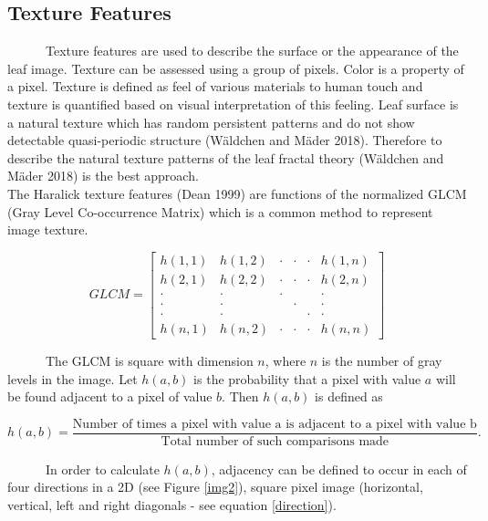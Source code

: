 \documentclass{article}
\begin{document}
\hypertarget{texture-features}{%
\subsection{Texture Features}\label{texture-features}}

~~~~~~Texture features are used to describe the surface or the
appearance of the leaf image. Texture can be assessed using a group of
pixels. Color is a property of a pixel. Texture is defined as feel of
various materials to human touch and texture is quantified based on
visual interpretation of this feeling. Leaf surface is a natural texture
which has random persistent patterns and do not show detectable
quasi-periodic structure (Wäldchen and Mäder 2018). Therefore to
describe the natural texture patterns of the leaf fractal theory
(Wäldchen and Mäder 2018) is the best approach.\\
\hspace*{0.333em}\hspace*{0.333em}\hspace*{0.333em}\hspace*{0.333em}\hspace*{0.333em}\hspace*{0.333em}The
Haralick texture features (Dean 1999) are functions of the normalized
GLCM (Gray Level Co-occurrence Matrix) which is a common method to
represent image texture.

\[GLCM = \begin{bmatrix}
h(1,1) & h(1,2)  & \cdot &\cdot &\cdot & h(1,n) \\ 
h(2,1) & h(2,2)  & \cdot &\cdot &\cdot & h(2,n) \\ 
\cdot  & \cdot & \cdot  & & &\cdot\\ 
\cdot  & \cdot &  & \cdot& &\cdot\\ 
\cdot  & \cdot &  & & \cdot &\cdot\\ 
h(n,1) & h(n,2) & \cdot &\cdot &\cdot & h(n,n)
\end{bmatrix}\]

~~~~~~The GLCM is square with dimension \(n\), where \(n\) is the number
of gray levels in the image. Let \(h(a,b)\) is the probability that a
pixel with value \(a\) will be found adjacent to a pixel of value \(b\).
Then \(h(a,b)\) is defined as

\[h(a,b) = \frac{\text{Number of times a pixel with value a is adjacent to a pixel with value b}}{\text{Total number of such comparisons made}}.\]

~~~~~~In order to calculate \(h(a,b)\), adjacency can be defined to
occur in each of four directions in a 2D (see Figure \ref{img2}), square
pixel image (horizontal, vertical, left and right diagonals - see
equation \ref{direction}).
\end{document}
